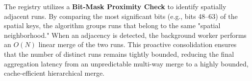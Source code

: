 The registry utilizes a \textbf{Bit-Mask Proximity Check} to identify spatially adjacent runs. By comparing the most significant bits (e.g., bits 48--63) of the spatial keys, the algorithm groups runs that belong to the same "spatial neighborhood." When an adjacency is detected, the background worker performs an $O(N)$ linear merge of the two runs. This proactive consolidation ensures that the number of distinct runs remains tightly bounded, reducing the final aggregation latency from an unpredictable multi-way merge to a highly bounded, cache-efficient hierarchical merge.
